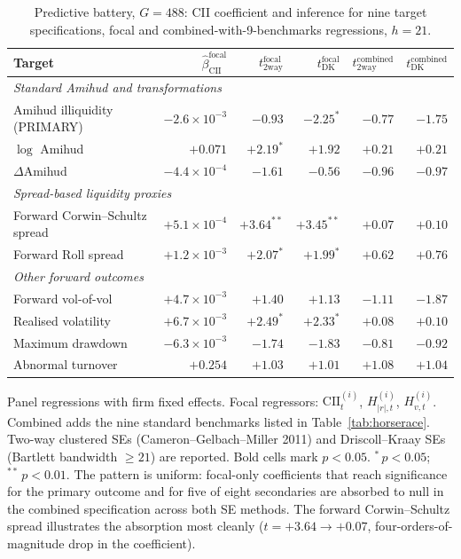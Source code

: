 \documentclass[preprint,12pt,authoryear]{elsarticle}
\begin{document}
\begin{table}[H]
\centering
\begin{threeparttable}
\caption{Predictive battery, $G = 488$: CII coefficient and inference for nine target specifications, focal and combined-with-9-benchmarks regressions, $h = 21$.}
\label{tab:battery}
\begin{tabular}{lrrrrr}
\toprule
Target & $\hat{\beta}^{\mathrm{focal}}_{\mathrm{CII}}$ & $t^{\mathrm{focal}}_{\mathrm{2way}}$ & $t^{\mathrm{focal}}_{\mathrm{DK}}$ & $t^{\mathrm{combined}}_{\mathrm{2way}}$ & $t^{\mathrm{combined}}_{\mathrm{DK}}$ \\
\midrule
\multicolumn{6}{l}{\emph{Standard Amihud and transformations}} \\
\quad Amihud illiquidity (PRIMARY) & $-2.6\!\times\!10^{-3}$ & $-0.93$ & $\mathbf{-2.25^{*}}$ & $-0.77$ & $-1.75$ \\
\quad $\log$ Amihud & $+0.071$ & $\mathbf{+2.19^{*}}$ & $+1.92$ & $+0.21$ & $+0.21$ \\
\quad $\Delta$Amihud & $-4.4\!\times\!10^{-4}$ & $-1.61$ & $-0.56$ & $-0.96$ & $-0.97$ \\
\midrule
\multicolumn{6}{l}{\emph{Spread-based liquidity proxies}} \\
\quad Forward Corwin--Schultz spread & $+5.1\!\times\!10^{-4}$ & $\mathbf{+3.64^{**}}$ & $\mathbf{+3.45^{**}}$ & $+0.07$ & $+0.10$ \\
\quad Forward Roll spread & $+1.2\!\times\!10^{-3}$ & $\mathbf{+2.07^{*}}$ & $\mathbf{+1.99^{*}}$ & $+0.62$ & $+0.76$ \\
\midrule
\multicolumn{6}{l}{\emph{Other forward outcomes}} \\
\quad Forward vol-of-vol & $+4.7\!\times\!10^{-3}$ & $+1.40$ & $+1.13$ & $-1.11$ & $-1.87$ \\
\quad Realised volatility & $+6.7\!\times\!10^{-3}$ & $\mathbf{+2.49^{*}}$ & $\mathbf{+2.33^{*}}$ & $+0.08$ & $+0.10$ \\
\quad Maximum drawdown & $-6.3\!\times\!10^{-3}$ & $-1.74$ & $-1.83$ & $-0.81$ & $-0.92$ \\
\quad Abnormal turnover & $+0.254$ & $+1.03$ & $+1.01$ & $+1.08$ & $+1.04$ \\
\bottomrule
\end{tabular}
\begin{tablenotes}
\small
\item Panel regressions with firm fixed effects. Focal regressors: $\mathrm{CII}^{(i)}_t$, $H^{(i)}_{|r|,t}$, $H^{(i)}_{v,t}$. Combined adds the nine standard benchmarks listed in Table~\ref{tab:horserace}. Two-way clustered SEs (Cameron--Gelbach--Miller 2011) and Driscoll--Kraay SEs (Bartlett bandwidth $\geq 21$) are reported. Bold cells mark $p < 0.05$. ${}^{*}\,p < 0.05$; ${}^{**}\,p < 0.01$. The pattern is uniform: focal-only coefficients that reach significance for the primary outcome and for five of eight secondaries are absorbed to null in the combined specification across both SE methods. The forward Corwin--Schultz spread illustrates the absorption most cleanly ($t = +3.64 \to +0.07$, four-orders-of-magnitude drop in the coefficient).
\end{tablenotes}
\end{threeparttable}
\end{table}
\end{document}
